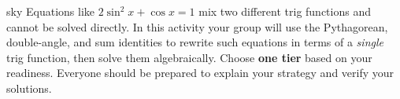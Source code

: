 \documentclass[10pt]{article}
\begin{document}
\namepartnerperiod

\vspace{0.10in}

\begin{scenariobox}{sky}
Equations like $2\sin^2 x + \cos x = 1$ mix two different trig functions and
cannot be solved directly. In this activity your group will use the Pythagorean,
double-angle, and sum identities to rewrite such equations in terms of a
\emph{single} trig function, then solve them algebraically.
Choose \textbf{one tier} based on your readiness. Everyone should be prepared
to explain your strategy and verify your solutions.
\end{scenariobox}

\vspace{0.08in}
\end{document}
